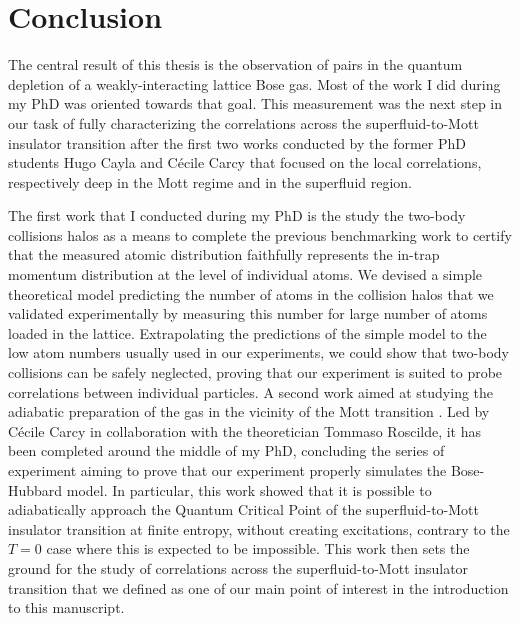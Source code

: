 \chapter*{Conclusion}

\label{chap:conclusion}



The central result of this thesis is the observation of \kmk pairs in the quantum depletion of a weakly-interacting lattice Bose gas. Most of the work I did during my PhD was oriented towards that goal. This measurement was the next step in our task of fully characterizing the correlations across the superfluid-to-Mott insulator transition after the first two works \cite{carcy2019momentum,cayla2020} conducted by the former PhD students Hugo Cayla and Cécile Carcy that focused on the local correlations, respectively deep in the Mott regime and in the superfluid region. 

The first work that I conducted during my PhD is the study the two-body collisions halos \cite{tenart2020two} as a means to complete the previous benchmarking work \cite{cayla2018single} to certify that the measured atomic distribution faithfully represents the in-trap momentum distribution at the level of individual atoms. We devised a simple theoretical model predicting the number of atoms in the collision halos that we validated experimentally by measuring this number for large number of atoms loaded in the lattice. Extrapolating the predictions of the simple model to the low atom numbers usually used in our experiments, we could show that two-body collisions can be safely neglected, proving that our experiment is suited to probe correlations between individual particles. A second work aimed at studying the adiabatic preparation of the gas in the vicinity of the Mott transition \cite{carcy2021}. Led by Cécile Carcy in collaboration with the theoretician Tommaso Roscilde, it has been completed around the middle of my PhD, concluding the series of experiment aiming to prove that our experiment properly simulates the Bose-Hubbard model. In particular, this work showed that it is possible to adiabatically approach the Quantum Critical Point of the superfluid-to-Mott insulator transition at finite entropy, \ie without creating excitations, contrary to the $T=0$ case where this is expected to be impossible. This work then sets the ground for the study of correlations across the superfluid-to-Mott insulator transition that we defined as one of our main point of interest in the introduction to this manuscript.

